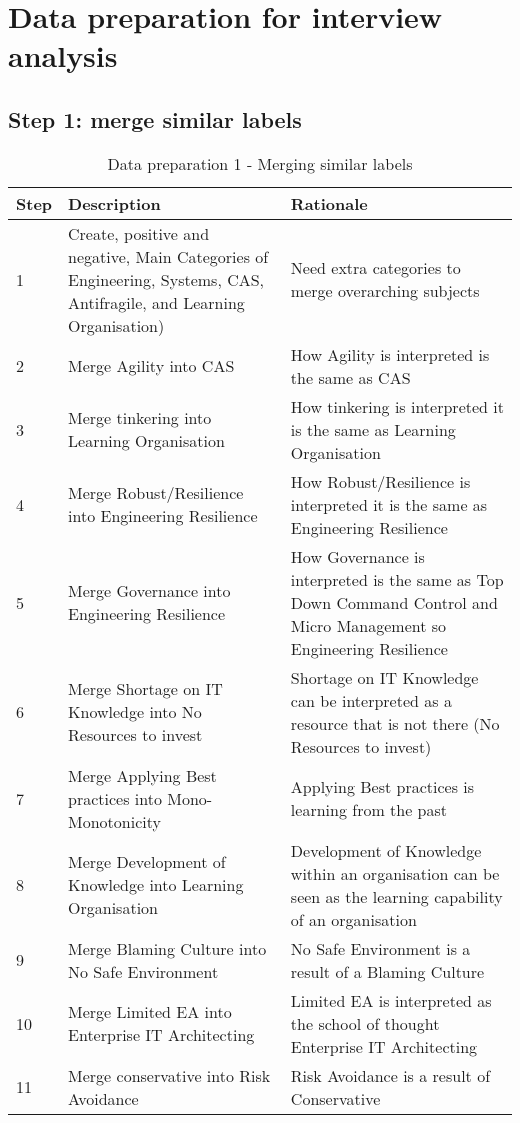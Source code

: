 \chapter{Data preparation for interview analysis}

\section{Step 1: merge similar labels}
\begin{table}[htbp]
	\centering
	\begin{tabular}{p{}p{}p{}}
		\toprule
		\textbf{Step} & \textbf{Description} & \textbf{Rationale} \\
		\midrule
		1     & Create, positive and negative, Main Categories of Engineering, Systems, CAS, Antifragile, and Learning Organisation) & Need extra categories to merge overarching subjects \\
		2     & Merge Agility into CAS & How Agility is interpreted is the same as CAS \\
		3     & Merge tinkering into Learning Organisation & How tinkering is interpreted it is the same as Learning Organisation \\
		4     & Merge Robust/Resilience into Engineering Resilience & How Robust/Resilience is interpreted it is the same as Engineering Resilience \\
		5     & Merge Governance into Engineering Resilience & How Governance is interpreted is the same as Top Down Command Control and Micro Management so Engineering Resilience \\
		6     & Merge Shortage on IT Knowledge into No Resources to invest & Shortage on IT Knowledge can be interpreted as a resource that is not there (No Resources to invest) \\
		7     & Merge Applying Best practices into Mono-Monotonicity & Applying Best practices is learning from the past \\
		8     & Merge Development of Knowledge into Learning Organisation & Development of Knowledge within an organisation can be seen as the learning capability of an organisation \\
		9     & Merge Blaming Culture into No Safe Environment & No Safe Environment is a result of a Blaming Culture \\
		10    & Merge Limited EA into Enterprise IT Architecting & Limited EA is interpreted as the school of thought Enterprise IT Architecting \\
		11    & Merge conservative into Risk Avoidance & Risk Avoidance is a result of Conservative \\
		\bottomrule
	\end{tabular}%
	\caption{Data preparation 1 - Merging similar labels}
	\label{tab:prepmergingsimilarlabels}%
\end{table}%

